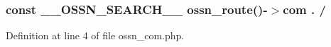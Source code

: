 \subsubsection[{\texorpdfstring{\+\_\+\+\_\+\+O\+S\+S\+N\+\_\+\+S\+E\+A\+R\+C\+H\+\_\+\+\_\+}{__OSSN_SEARCH__}}]{\setlength{\rightskip}{0pt plus 5cm}const \+\_\+\+\_\+\+O\+S\+S\+N\+\_\+\+S\+E\+A\+R\+C\+H\+\_\+\+\_\+ {\bf ossn\+\_\+route}()-\/$>$com . /\textquotesingle{}}\hypertarget{_ossn_search_2ossn__com_8php_afae131fc9f37f64df50c4599b2a39c1f}{}\label{_ossn_search_2ossn__com_8php_afae131fc9f37f64df50c4599b2a39c1f}


Definition at line 4 of file ossn\+\_\+com.\+php.

